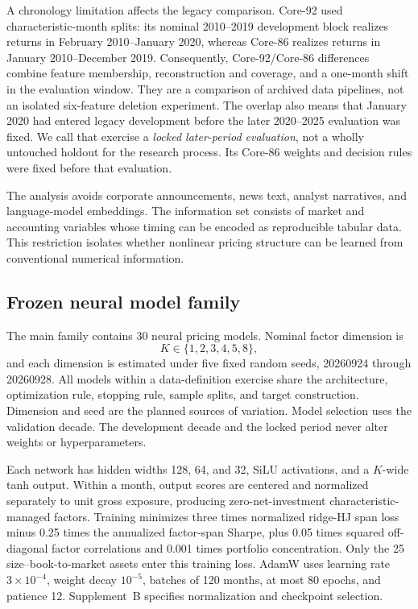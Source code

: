 A chronology limitation affects the legacy comparison. Core-92 used characteristic-month splits: its nominal 2010--2019 development block realizes returns in February 2010--January 2020, whereas Core-86 realizes returns in January 2010--December 2019. Consequently, Core-92/Core-86 differences combine feature membership, reconstruction and coverage, and a one-month shift in the evaluation window. They are a comparison of archived data pipelines, not an isolated six-feature deletion experiment. The overlap also means that January 2020 had entered legacy development before the later 2020--2025 evaluation was fixed. We call that exercise a \emph{locked later-period evaluation}, not a wholly untouched holdout for the research process. Its Core-86 weights and decision rules were fixed before that evaluation.

The analysis avoids corporate announcements, news text, analyst narratives, and language-model embeddings. The information set consists of market and accounting variables whose timing can be encoded as reproducible tabular data. This restriction isolates whether nonlinear pricing structure can be learned from conventional numerical information.

\subsection{Frozen neural model family}

The main family contains 30 neural pricing models. Nominal factor dimension is
\[
 K\in\{1,2,3,4,5,8\},
\]
and each dimension is estimated under five fixed random seeds, 20260924 through 20260928. All models within a data-definition exercise share the architecture, optimization rule, stopping rule, sample splits, and target construction. Dimension and seed are the planned sources of variation. Model selection uses the validation decade. The development decade and the locked period never alter weights or hyperparameters.

Each network has hidden widths 128, 64, and 32, SiLU activations, and a $K$-wide tanh output. Within a month, output scores are centered and normalized separately to unit gross exposure, producing zero-net-investment characteristic-managed factors. Training minimizes three times normalized ridge-HJ span loss minus 0.25 times the annualized factor-span Sharpe, plus 0.05 times squared off-diagonal factor correlations and 0.001 times portfolio concentration. Only the 25 size--book-to-market assets enter this training loss. AdamW uses learning rate $3\times10^{-4}$, weight decay $10^{-5}$, batches of 120 months, at most 80 epochs, and patience 12. Supplement~B specifies normalization and checkpoint selection.

